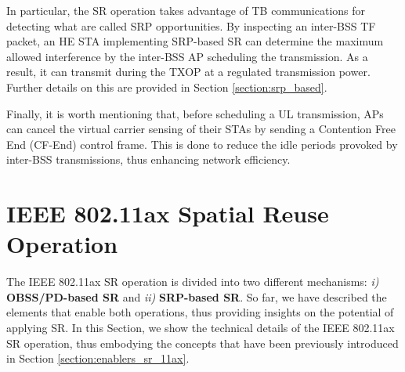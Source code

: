 \documentclass[comsoc]{IEEEtran}
\begin{document}
	
	In particular, the SR operation takes advantage of TB communications for detecting what are called SRP opportunities. By inspecting an inter-BSS TF packet, an HE STA implementing SRP-based SR can determine the maximum allowed interference by the inter-BSS AP scheduling the transmission. As a result, it can transmit during the TXOP at a regulated transmission power. Further details on this are provided in Section \ref{section:srp_based}.
	
	Finally, it is worth mentioning that, before scheduling a UL transmission, APs can cancel the virtual carrier sensing of their STAs by sending a Contention Free End (CF-End) control frame. This is done to reduce the idle periods provoked by inter-BSS transmissions, thus enhancing network efficiency. %
	
	
	\section{IEEE 802.11ax Spatial Reuse Operation}
	\label{section:operation_sr_11ax}
	The IEEE 802.11ax SR operation is divided into two different mechanisms: \emph{i)} \textbf{OBSS/PD-based SR} and \emph{ii)} \textbf{SRP-based SR}. So far, we have described the elements that enable both operations, thus providing insights on the potential of applying SR. In this Section, we show the technical details of the IEEE 802.11ax SR operation, thus embodying the concepts that have been previously introduced in Section \ref{section:enablers_sr_11ax}.
	
\end{document}
